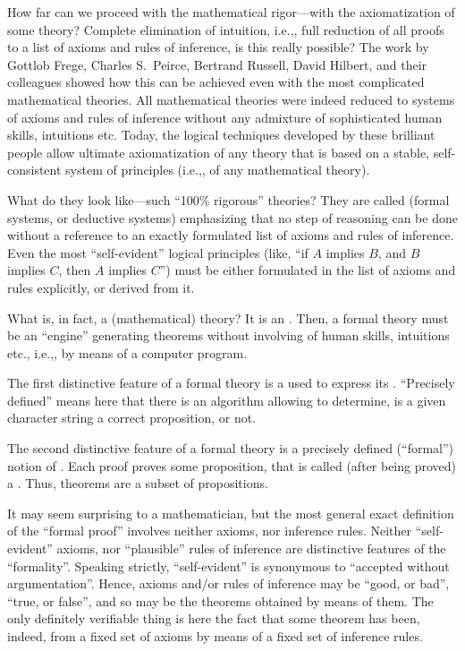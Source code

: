 How far can we proceed with the mathematical rigor---with the axiomatization of some theory?
Complete elimination of intuition, i.e.,, full reduction of all proofs to a list of axioms and rules of inference, is this really possible?
The work by Gottlob Frege, Charles S.\ Peirce, Bertrand Russell, David Hilbert, and their colleagues showed how this can be achieved even with the most complicated mathematical theories.
All mathematical theories were indeed reduced to systems of axioms and rules of inference without any admixture of sophisticated human skills, intuitions etc.
Today, the logical techniques developed by these brilliant people allow ultimate axiomatization of any theory that is based on a stable, self-consistent system of principles (i.e.,, of any mathematical theory).

What do they look like---such ``100\% rigorous'' theories?
They are called  (formal systems, or deductive systems) emphasizing that no step of reasoning can be done without a reference to an exactly formulated list of axioms and rules of inference.
Even the most ``self-evident'' logical principles (like, ``if \(A\) implies \(B\), and \(B\) implies \(C\), then \(A\) implies \(C\)'') must be either formulated in the list of axioms and rules explicitly, or derived from it.

What is, in fact, a (mathematical) theory?
It is an .
Then, a formal theory must be an ``engine'' generating theorems without involving of human skills, intuitions etc., i.e.,, by means of a computer program.

The first distinctive feature of a formal theory is a  used to express its .
``Precisely defined'' means here that there is an algorithm allowing to determine, is a given character string a correct proposition, or not.

The second distinctive feature of a formal theory is a precisely defined (``formal'') notion of .
Each proof proves some proposition, that is called (after being proved) a .
Thus, theorems are a subset of propositions.

It may seem surprising to a mathematician, but the most general exact definition of the ``formal proof'' involves neither axioms, nor inference rules.
Neither ``self-evident'' axioms, nor ``plausible'' rules of inference are distinctive features of the ``formality''.
Speaking strictly, ``self-evident'' is synonymous to ``accepted without argumentation''.
Hence, axioms and/or rules of inference may be ``good, or bad'', ``true, or false'', and so may be the theorems obtained by means of them.
The only definitely verifiable thing is here the fact that some theorem has been, indeed,  from a fixed set of axioms by means of a fixed set of inference rules.

